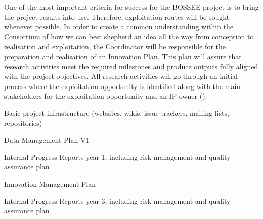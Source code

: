 \begin{workpackage}
\begin{tasklist}
\begin{task}[
  title=Innovation Management,
  id=innovation-management,
  lead=SRL,
  PM=6,
  wphases={0-48},
  partners={SRL,UPSUD,XFEL,QS,SIL,WTT,UIO,EGI,INSERM,CDS,EP}
]
One of the most important criteria for success for the BOSSEE project is to bring the project results into use. Therefore, exploitation routes will be sought whenever possible. In order to create a common understanding within the Consortium of how we can best shepherd an idea all the way from conception to realisation and exploitation, the Coordinator will be responsible for the preparation and realisation of an Innovation Plan. This plan will assure that research activities meet the required milestones and produce outputs fully aligned with the project objectives. All research activities will go through an initial process where the exploitation opportunity is identified along with the main stakeholders for the exploitation opportunity and an IP owner
().
\end{task}

\end{tasklist}


\begin{wpdelivs}

\begin{wpdeliv}[due=1,miles=startup,id=infrastructure,dissem=PU,nature=DEC,lead=SRL]
  {Basic project infrastructure (websites, wikis, issue trackers, mailing lists, repositories)}
\end{wpdeliv}

\begin{wpdeliv}[due=6,miles=startup,id=data-management-plan,dissem=PU,nature=R,lead=SRL]
  {Data Management Plan V1}
\end{wpdeliv}

\begin{wpdeliv}[due=12,miles=startup,id=progress-report-1,dissem=CO,nature=R,lead=SRL]
  {Internal Progress Reports year 1, including risk management and quality assurance plan}
\end{wpdeliv}

\begin{wpdeliv}[due=18,miles=startup,id=innovation-management-plan,dissem=CO,nature=R,lead=SRL]
  {Innovation Management Plan}
\end{wpdeliv}

\begin{wpdeliv}[due=36,miles=startup,id=progress-report-2,dissem=CO,nature=R,lead=SRL]
  {Internal Progress Reports year 3, including risk management and quality assurance plan}
\end{wpdeliv}

\end{wpdelivs}
\end{workpackage}

